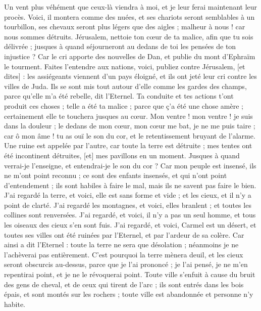 \begin{multicols}{2}
Un vent plus véhément que ceux-là viendra à moi, et je leur ferai maintenant leur procès.
Voici, il montera comme des nuées, et ses chariots seront semblables à un tourbillon, ses chevaux seront plus légers que des aigles ; malheur à nous ! car nous sommes détruits.
Jérusalem, nettoie ton cœur de ta malice, afin que tu sois délivrée ; jusques à quand séjourneront au dedans de toi les pensées de ton injustice ?
Car le cri apporte des nouvelles de Dan, et publie du mont d'Ephraïm le tourment.
Faites l'entendre aux nations, voici, publiez contre Jérusalem, [et dites] : les assiégeants viennent d'un pays éloigné, et ils ont jeté leur cri contre les villes de Juda.
Ils se sont mis tout autour d'elle comme les gardes des champs, parce qu'elle m'a été rebelle, dit l'Eternel.
Ta conduite et tes actions t'ont produit ces choses ; telle a été ta malice ; parce que ç'a été une chose amère ; certainement elle te touchera jusques au cœur.
Mon ventre ! mon ventre ! je suis dans la douleur ; le dedans de mon cœur, mon cœur me bat, je ne me puis taire ; car ô mon âme ! tu as ouï le son du cor, et le retentissement bruyant de l'alarme.
Une ruine est appelée par l'autre, car toute la terre est détruite ; mes tentes ont été incontinent détruites, [et] mes pavillons en un moment.
Jusques à quand verrai-je l'enseigne, et entendrai-je le son du cor ?
Car mon peuple est insensé, ils ne m'ont point reconnu ; ce sont des enfants insensés, et qui n'ont point d'entendement ; ils sont habiles à faire le mal, mais ils ne savent pas faire le bien.
J'ai regardé la terre, et voici, elle est sans forme et vide ; et les cieux, et il n'y a point de clarté.
J'ai regardé les montagnes, et voici, elles branlent ; et toutes les collines sont renversées.
J'ai regardé, et voici, il n'y a pas un seul homme, et tous les oiseaux des cieux s'en sont fuis.
J'ai regardé, et voici, Carmel est un désert, et toutes ses villes ont été ruinées par l'Eternel, et par l'ardeur de sa colère.
Car ainsi a dit l'Eternel : toute la terre ne sera que désolation ; néanmoins je ne l'achèverai pas entièrement.
C'est pourquoi la terre mènera deuil, et les cieux seront obscurcis au-dessus, parce que je l'ai prononcé ; je l'ai pensé, je ne m'en repentirai point, et je ne le révoquerai point.
Toute ville s'enfuit à cause du bruit des gens de cheval, et de ceux qui tirent de l'arc ; ils sont entrés dans les bois épais, et sont montés sur les rochers ; toute ville est abandonnée et personne n'y habite.

\end{multicols}
